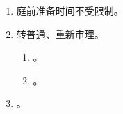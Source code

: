 \begin{enumerate}
\begin{enumerate}
\begin{enumerate}
                  \item {}。
                  \item {}。
                \end{enumerate}
          \item 庭前准备时间不受限制。
          \item 转普通、重新审理。
                \begin{enumerate}
                  \item {}。
                  \item {}。
                \end{enumerate}
          \item {}。
        \end{enumerate}
\end{enumerate}
